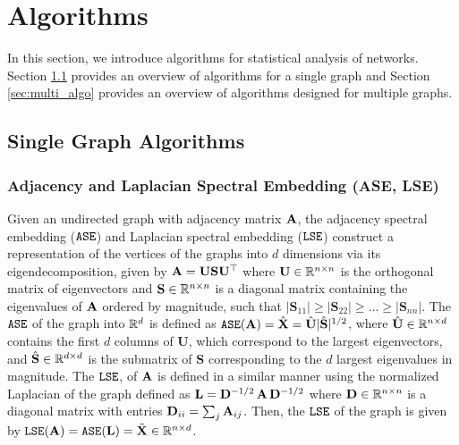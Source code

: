 \section{Algorithms}\label{sec:algorithms}
In this section, we introduce algorithms for statistical analysis of networks. Section \ref{sec:single_algo} provides an overview of algorithms for a single graph and Section \ref{sec:multi_algo} provides an overview of algorithms designed for multiple graphs. 

\subsection{Single Graph Algorithms}\label{sec:single_algo}
\subsubsection{Adjacency and Laplacian Spectral Embedding (ASE, LSE)} \label{sec:ase}
Given an undirected graph with adjacency matrix $\operatorname{\mathbf{A}}$, the adjacency spectral embedding ($\operatorname{\mathtt{ASE}}$) and Laplacian spectral embedding ($\operatorname{\mathtt{LSE}}$) construct a representation of the vertices of the graphs into $d$ dimensions via its eigendecomposition, given by
$\operatorname{\mathbf{A}} = \mathbf{U}\mathbf{S}\mathbf{U}^\top$
where $\mathbf{U}\in\mathbb{R}^{n\times n}$ is the orthogonal matrix of eigenvectors and $\mathbf{S}\in\mathbb{R}^{n\times n}$ is a diagonal matrix containing the eigenvalues of $\operatorname{\mathbf{A}}$ ordered by magnitude, such that $|\mathbf{S}_{11}|\geq |\mathbf{S}_{22}| \geq \ldots \geq |\mathbf{S}_{nn}|$. 
 The $\operatorname{\mathtt{ASE}}$ of the graph into $\mathbb{R}^{d}$ is defined as $\operatorname{\mathtt{ASE}}(\operatorname{\mathbf{A}})=\hat{\operatorname{\mathbf{X}}}= \hat{\mathbf{U}}|\hat{\mathbf{S}}|^{1/2}$, where $\hat{\mathbf{U}}\in\mathbb{R}^{n\times d}$ contains the first $d$ columns of $\mathbf{U}$, which correspond to the largest eigenvectors, and $\hat{\mathbf{S}}\in\mathbb{R}^{d\times d}$ is the submatrix of $\mathbf{S}$ corresponding to the $d$ largest eigenvalues in magnitude. The $\operatorname{\mathtt{LSE}}$, of $\operatorname{\mathbf{A}}$ is defined in a similar manner using the normalized Laplacian of the graph defined as $\mathbf{L} = \mathbf{D}^{-1/2}\operatorname{\mathbf{A}}\mathbf{D}^{-1/2}$ where $\mathbf{D} \in\mathbb{R}^{n\times n}$ is a diagonal matrix with entries $\mathbf{D}_{ii}=\sum_j\operatorname{\mathbf{A}}_{ij}$. Then, the $\operatorname{\mathtt{LSE}}$ of the graph is given by $\operatorname{\mathtt{LSE}}(\operatorname{\mathbf{A}})=\operatorname{\mathtt{ASE}}(\mathbf{L})=\tilde {\operatorname{\mathbf{X}}}\in\mathbb{R}^{n\times d}$.
 
